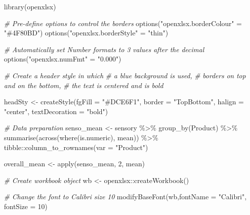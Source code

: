 \documentclass[
]{book}
\newenvironment{Shaded}{\begin{snugshade}}{\end{snugshade}}
\newcommand{\AttributeTok}[1]{\textcolor[rgb]{0.77,0.63,0.00}{#1}}
\newcommand{\CommentTok}[1]{\textcolor[rgb]{0.56,0.35,0.01}{\textit{#1}}}
\newcommand{\DecValTok}[1]{\textcolor[rgb]{0.00,0.00,0.81}{#1}}
\newcommand{\FunctionTok}[1]{\textcolor[rgb]{0.00,0.00,0.00}{#1}}
\newcommand{\NormalTok}[1]{#1}
\newcommand{\OtherTok}[1]{\textcolor[rgb]{0.56,0.35,0.01}{#1}}
\newcommand{\SpecialCharTok}[1]{\textcolor[rgb]{0.00,0.00,0.00}{#1}}
\newcommand{\StringTok}[1]{\textcolor[rgb]{0.31,0.60,0.02}{#1}}
\begin{document}
\begin{Shaded}
\begin{Highlighting}[]
\FunctionTok{library}\NormalTok{(openxlsx)}

\CommentTok{\# Pre{-}define options to control the borders }
\FunctionTok{options}\NormalTok{(}\StringTok{"openxlsx.borderColour"} \OtherTok{=} \StringTok{"\#4F80BD"}\NormalTok{)}
\FunctionTok{options}\NormalTok{(}\StringTok{"openxlsx.borderStyle"} \OtherTok{=} \StringTok{"thin"}\NormalTok{)}

\CommentTok{\# Automatically set Number formats to 3 values after the decimal}
\FunctionTok{options}\NormalTok{(}\StringTok{"openxlsx.numFmt"} \OtherTok{=} \StringTok{"0.000"}\NormalTok{)}

\CommentTok{\# Create a header style in which }
  \CommentTok{\# a blue background is used,}
  \CommentTok{\# borders on top and on the bottom, }
  \CommentTok{\# the text is centered and is bold}

\NormalTok{headSty }\OtherTok{\textless{}{-}} \FunctionTok{createStyle}\NormalTok{(}\AttributeTok{fgFill =} \StringTok{"\#DCE6F1"}\NormalTok{,}
                       \AttributeTok{border =} \StringTok{"TopBottom"}\NormalTok{,}
                       \AttributeTok{halign =} \StringTok{"center"}\NormalTok{,}
                       \AttributeTok{textDecoration =} \StringTok{"bold"}\NormalTok{)}

\CommentTok{\# Data preparation}
\NormalTok{senso\_mean }\OtherTok{\textless{}{-}}\NormalTok{ sensory }\SpecialCharTok{\%\textgreater{}\%} 
  \FunctionTok{group\_by}\NormalTok{(Product) }\SpecialCharTok{\%\textgreater{}\%} 
  \FunctionTok{summarise}\NormalTok{(}\FunctionTok{across}\NormalTok{(}\FunctionTok{where}\NormalTok{(is.numeric), mean)) }\SpecialCharTok{\%\textgreater{}\%} 
\NormalTok{  tibble}\SpecialCharTok{::}\FunctionTok{column\_to\_rownames}\NormalTok{(}\AttributeTok{var =} \StringTok{"Product"}\NormalTok{)}

\NormalTok{overall\_mean }\OtherTok{\textless{}{-}} \FunctionTok{apply}\NormalTok{(senso\_mean, }\DecValTok{2}\NormalTok{, mean)}

\CommentTok{\# Create workbook object}
\NormalTok{wb }\OtherTok{\textless{}{-}}\NormalTok{ openxlsx}\SpecialCharTok{::}\FunctionTok{createWorkbook}\NormalTok{()}

\CommentTok{\# Change the font to Calibri size 10}
\FunctionTok{modifyBaseFont}\NormalTok{(wb,}\AttributeTok{fontName =} \StringTok{"Calibri"}\NormalTok{, }\AttributeTok{fontSize =} \DecValTok{10}\NormalTok{)}


\end{Highlighting}
\end{Shaded}
\end{document}
